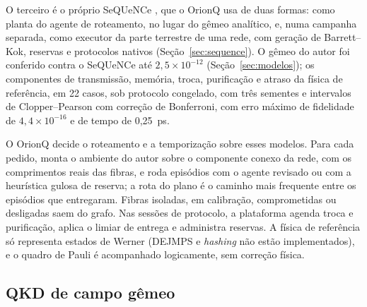 \documentclass[12pt]{article}
\begin{document}
O terceiro é o próprio SeQUeNCe \cite{wu2021}, que o OrionQ usa de duas formas:
como planta do agente de roteamento, no lugar do gêmeo analítico, e, numa
campanha separada, como executor da parte terrestre de uma rede, com geração de
Barrett--Kok, reservas e protocolos nativos (Seção~\ref{sec:sequence}). O gêmeo do autor foi conferido contra o
SeQUeNCe até $2{,}5\times10^{-12}$ (Seção~\ref{sec:modelos}); os componentes de
transmissão, memória, troca, purificação e atraso da física de referência, em 22
casos, sob protocolo congelado, com três sementes e intervalos de
Clopper--Pearson \cite{clopper1934} com correção de Bonferroni, com erro máximo
de fidelidade de $4{,}4\times10^{-16}$ e de tempo de 0,25~ps.

O OrionQ decide o roteamento e a temporização sobre esses modelos. Para cada
pedido, monta o ambiente do autor sobre o componente conexo da rede, com os
comprimentos reais das fibras, e roda episódios com o agente revisado ou com a
heurística gulosa de reserva; a rota do plano é o caminho mais frequente entre
os episódios que entregaram. Fibras isoladas, em calibração, comprometidas ou
desligadas saem do grafo. Nas sessões de protocolo, a plataforma agenda troca e
purificação, aplica o limiar de entrega e administra reservas. A física de
referência só representa estados de Werner (DEJMPS e \textit{hashing} não estão
implementados), e o quadro de Pauli é acompanhado logicamente, sem correção
física.

\subsection{QKD de campo gêmeo}
\label{sec:tec_tf}
\end{document}
